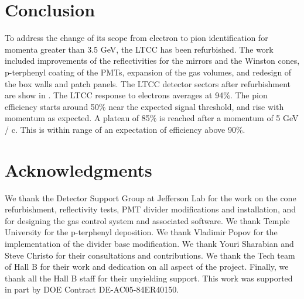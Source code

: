 \section{Conclusion}

To address the change of its scope from electron to pion identification for momenta
greater than 3.5 GeV, the LTCC has been refurbished. The work included improvements of the
reflectivities for the mirrors and the Winston cones, p-terphenyl
coating of the PMTs, expansion of the gas volumes, and redesign of the box walls and patch panels.
The LTCC detector sectors after refurbishment are show in .
The LTCC response to electrons averages at 94$\%$. The pion efficiency starts around 50$\%$ near the expected signal threshold,
and rise with momentum as expected. A plateau of 85$\%$ is reached after a momentum of 5 GeV / c.
This is within range of an expectation of efficiency above 90$\%$.


\section{Acknowledgments}

We thank the Detector Support Group at Jefferson Lab for the work on the cone refurbishment, reflectivity tests,
PMT divider modifications and installation, and for designing the gas control system and associated software.
We thank Temple University for the p-terphenyl deposition. We thank Vladimir Popov for the implementation
of the divider base modification. We thank Youri Sharabian and Steve Christo for their consultations and contributions.
We thank the Tech team of Hall B for their work and dedication on all aspect of the project.
Finally, we thank all the Hall B staff for their unyielding support.
This work was supported in part by DOE Contract DE-AC05-84ER40150.

